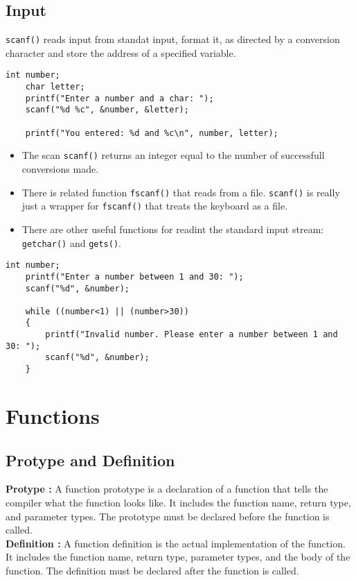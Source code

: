 \documentclass[a4paper, 10pt]{article}
\begin{document}
\subsection{Input}
\texttt{scanf()} reads input from standat input, format it, as directed by a conversion character and store the address of a specified variable.
\begin{lstlisting}[style=cStyle, caption={Reading an integer}]
    int number; 
    char letter; 
    printf("Enter a number and a char: ");
    scanf("%d %c", &number, &letter);

    printf("You entered: %d and %c\n", number, letter);
\end{lstlisting}
\begin{itemize}
    \item The scan \texttt{scanf()} returns an integer equal to the number of successfull conversions made.
    \item There is related function \texttt{fscanf()} that reads from a file. \texttt{scanf()} is really just a wrapper for \texttt{fscanf()} that treats the keyboard as a file.
    \item There are other useful functions for readint the standard input stream: \texttt{getchar()} and \texttt{gets()}.
\end{itemize}
\begin{lstlisting}[style=cStyle, caption={Check for no input}]
    int number;
    printf("Enter a number between 1 and 30: ");
    scanf("%d", &number);

    while ((number<1) || (number>30))
    {
        printf("Invalid number. Please enter a number between 1 and 30: ");
        scanf("%d", &number);
    }
\end{lstlisting}

\section{Functions}
\subsection{Protype and Definition}
\textbf{Protype :} A function prototype is a declaration of a function that tells the compiler what the function looks like. It includes the function name, return type, and parameter types. The prototype must be declared before the function is called.\\[2ex]
\textbf{Definition :} A function definition is the actual implementation of the function. It includes the function name, return type, parameter types, and the body of the function. The definition must be declared after the function is called.
\end{document}
